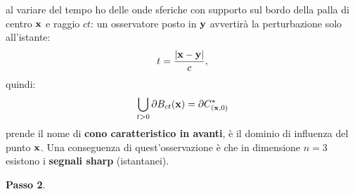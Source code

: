 \begin{oss}
\begin{figure}[H]

    \end{figure}
    \FloatBarrier

    al variare del tempo ho delle onde sferiche con supporto sul bordo della palla di centro $\mathbf{x}$ e raggio $ct$: un osservatore posto in $\mathbf{y}$ avvertirà la perturbazione solo all'istante:
    \begin{equation*}
        t=\frac{| \mathbf{x} -\mathbf{y}| }{c} ,
    \end{equation*}
    quindi:
    \begin{equation}
        \bigcup _{t >0} \partial B_{ct}(\mathbf{x}) =\partial C_{(\mathbf{x} ,0)}^{*}
    \end{equation}
    prende il nome di \textbf{cono caratteristico in avanti}, è il dominio di influenza del punto $\mathbf{x}$. Una conseguenza di quest'osservazione è che in dimensione $n=3$ esistono i \textbf{segnali sharp} (istantanei).
\end{oss}

\textbf{Passo 2}.

